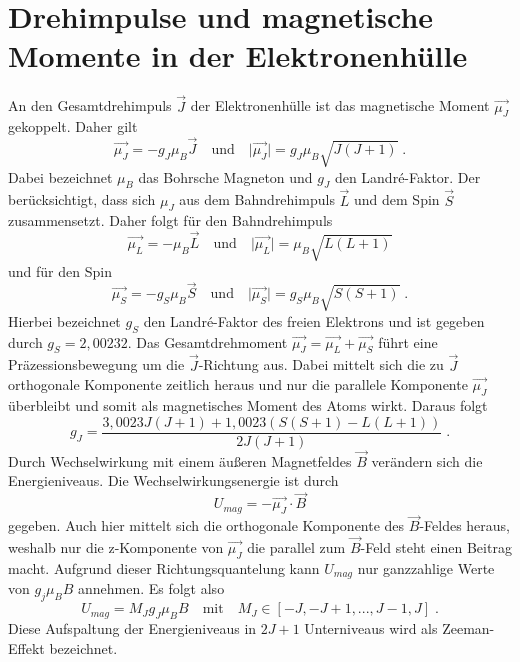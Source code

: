 \section{Drehimpulse und magnetische Momente in der Elektronenhülle}
An den Gesamtdrehimpuls $ \vec{J}$ der Elektronenhülle ist das magnetische Moment $\vec{\mu_J}$ 
gekoppelt. Daher gilt
\begin{equation}
\vec{\mu_J} = -g_J \mu_B \vec{J} \quad \text{und} \quad
\lvert \vec{\mu_J} \rvert = g_J \mu_B \sqrt{J(J+1)}  \; .
\label{eq:muJ}
\end{equation}
Dabei bezeichnet $\mu_B$ das Bohrsche Magneton und $g_J$ den Landr\'{e}-Faktor. Der berücksichtigt,
dass sich $\mu_J$ aus dem Bahndrehimpuls $\vec{L}$ und dem Spin $\vec{S}$ zusammensetzt.
Daher folgt für den Bahndrehimpuls
\begin{equation}
\vec{\mu_L} = - \mu_B \vec{L} \quad \text{und} \quad
\lvert \vec{\mu_L} \rvert =  \mu_B \sqrt{L(L+1)}
\label{eq:muL}
\end{equation}
und für den Spin
\begin{equation}
\vec{\mu_S} = - g_S \mu_B \vec{S} \quad \text{und} \quad
\lvert \vec{\mu_S} \rvert = 	g_S \mu_B \sqrt{S(S+1)} \; .
\label{eq:muS}
\end{equation}
Hierbei bezeichnet $g_S$ den Landr\'{e}-Faktor des freien Elektrons und ist gegeben durch 
$ g_S = 2,00232$. Das Gesamtdrehmoment $\vec{\mu_J} = \vec{\mu_L}+\vec{\mu_S}$ führt eine 
Präzessionsbewegung um die $\vec{J}$-Richtung aus. Dabei mittelt sich die zu $\vec{J}$ 
orthogonale Komponente zeitlich heraus und nur die parallele Komponente $\vec{\mu_J}$  
überbleibt und somit als magnetisches Moment des Atoms wirkt. Daraus folgt
\begin{equation}
g_J = \frac{3,0023J(J+1) + 1,0023(S(S+1) - L(L+1))}{2J(J+1)}\; .
\label{eq:gJ}
\end{equation}
Durch Wechselwirkung mit einem äußeren Magnetfeldes $\vec{B}$ verändern sich die Energieniveaus. 
Die Wechselwirkungsenergie ist durch 
\begin{equation}
U_{mag} = - \vec{\mu_J} \cdot \vec{B}
\end{equation}
gegeben. Auch hier mittelt sich die orthogonale Komponente des $\vec{B}$-Feldes heraus, weshalb nur 
die z-Komponente von $\vec{\mu_J}$  die parallel zum $\vec{B}$-Feld steht einen Beitrag macht. 
Aufgrund dieser Richtungsquantelung kann $U_{mag}$ nur ganzzahlige Werte von $g_j \mu_B B$ 
annehmen. Es folgt also 
\begin{equation}
U_{mag} = M_J g_J \mu_B B \quad \text{mit} \quad M_J \in [-J,-J+1,...,J-1,J] \; .
\end{equation}
Diese Aufspaltung der Energieniveaus in $2J+1$ Unterniveaus wird als Zeeman-Effekt bezeichnet.

